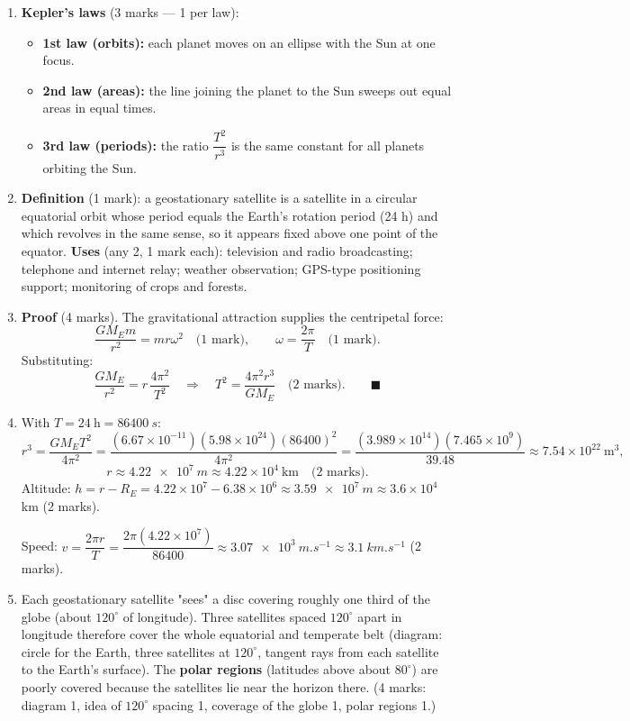 \documentclass[11pt]{article}
\begin{document}
\begin{corrige}
\begin{enumerate}
\item \textbf{Kepler's laws} (3 marks — 1 per law):
\begin{itemize}
\item \textbf{1st law (orbits):} each planet moves on an ellipse with the Sun at one focus.
\item \textbf{2nd law (areas):} the line joining the planet to the Sun sweeps out equal areas in equal times.
\item \textbf{3rd law (periods):} the ratio $\dfrac{T^2}{r^3}$ is the same constant for all planets orbiting the Sun.
\end{itemize}
\item \textbf{Definition} (1 mark): a geostationary satellite is a satellite in a circular equatorial orbit whose period equals the Earth's rotation period (24 h) and which revolves in the same sense, so it appears fixed above one point of the equator. \textbf{Uses} (any 2, 1 mark each): television and radio broadcasting; telephone and internet relay; weather observation; GPS-type positioning support; monitoring of crops and forests.
\item \textbf{Proof} (4 marks). The gravitational attraction supplies the centripetal force:
\[
\frac{GM_E m}{r^2} = m r \omega^2 \quad \text{(1 mark)}, \qquad \omega = \frac{2\pi}{T} \quad \text{(1 mark)}.
\]
Substituting:
\[
\frac{GM_E}{r^2} = r\,\frac{4\pi^2}{T^2}
\quad\Longrightarrow\quad
T^2 = \frac{4\pi^2 r^3}{GM_E} \quad \text{(2 marks)}. \qquad \blacksquare
\]
\item With $T = 24\ \mathrm{h} = \SI{86400}{s}$:
\[
r^3 = \frac{GM_E T^2}{4\pi^2} = \frac{(6.67\times10^{-11})(5.98\times10^{24})(86400)^2}{4\pi^2}
= \frac{(3.989\times10^{14})(7.465\times10^{9})}{39.48}
\approx 7.54\times10^{22}\ \mathrm{m^3},
\]
\[
r \approx \SI{4.22e7}{m} \approx 4.22\times10^{4}\ \mathrm{km} \quad \text{(2 marks)}.
\]
Altitude: $h = r - R_E = 4.22\times10^{7} - 6.38\times10^{6} \approx \SI{3.59e7}{m} \approx 3.6\times10^{4}$ km (2 marks).

Speed: $v = \dfrac{2\pi r}{T} = \dfrac{2\pi(4.22\times10^{7})}{86400} \approx \SI{3.07e3}{m.s^{-1}} \approx \SI{3.1}{km.s^{-1}}$ (2 marks).
\item Each geostationary satellite "sees" a disc covering roughly one third of the globe (about $120^{\circ}$ of longitude). Three satellites spaced $120^{\circ}$ apart in longitude therefore cover the whole equatorial and temperate belt (diagram: circle for the Earth, three satellites at $120^{\circ}$, tangent rays from each satellite to the Earth's surface). The \textbf{polar regions} (latitudes above about $80^{\circ}$) are poorly covered because the satellites lie near the horizon there. (4 marks: diagram 1, idea of $120^{\circ}$ spacing 1, coverage of the globe 1, polar regions 1.)
\end{enumerate}
\end{corrige}
\end{document}
